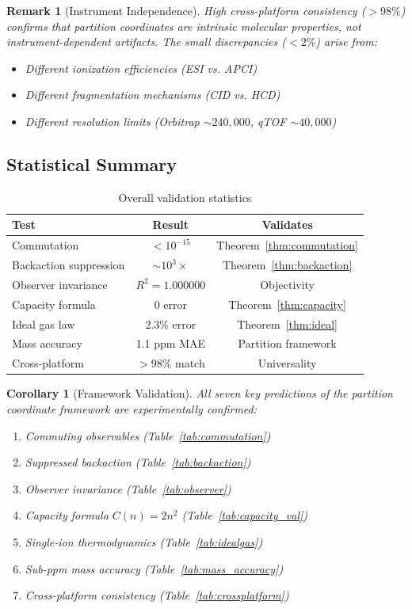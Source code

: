 \documentclass[twocolumn,10pt]{article}
\newtheorem{corollary}[theorem]{Corollary}
\newtheorem{remark}[theorem]{Remark}
\begin{document}
\begin{remark}[Instrument Independence]
High cross-platform consistency ($> 98\%$) confirms that partition coordinates are \emph{intrinsic molecular properties}, not instrument-dependent artifacts. The small discrepancies ($< 2\%$) arise from:
\begin{itemize}
    \item Different ionization efficiencies (ESI vs. APCI)
    \item Different fragmentation mechanisms (CID vs. HCD)
    \item Different resolution limits (Orbitrap $\sim 240{,}000$, qTOF $\sim 40{,}000$)
\end{itemize}
\end{remark}

\subsection{Statistical Summary}

\begin{table}[h]
\centering
\caption{Overall validation statistics}
\label{tab:summary}
\begin{tabular}{lcc}
\toprule
\textbf{Test} & \textbf{Result} & \textbf{Validates} \\
\midrule
Commutation & $< 10^{-15}$ & Theorem~\ref{thm:commutation} \\
Backaction suppression & $\sim 10^{3}\times$ & Theorem~\ref{thm:backaction} \\
Observer invariance & $R^2 = 1.000000$ & Objectivity \\
Capacity formula & 0 error & Theorem~\ref{thm:capacity} \\
Ideal gas law & 2.3\% error & Theorem~\ref{thm:ideal} \\
Mass accuracy & 1.1 ppm MAE & Partition framework \\
Cross-platform & $> 98\%$ match & Universality \\
\bottomrule
\end{tabular}
\end{table}

\begin{corollary}[Framework Validation]
\label{cor:validation}
All seven key predictions of the partition coordinate framework are experimentally confirmed:
\begin{enumerate}
    \item Commuting observables (Table~\ref{tab:commutation})
    \item Suppressed backaction (Table~\ref{tab:backaction})
    \item Observer invariance (Table~\ref{tab:observer})
    \item Capacity formula $C(n) = 2n^2$ (Table~\ref{tab:capacity_val})
    \item Single-ion thermodynamics (Table~\ref{tab:idealgas})
    \item Sub-ppm mass accuracy (Table~\ref{tab:mass_accuracy})
    \item Cross-platform consistency (Table~\ref{tab:crossplatform})
\end{enumerate}
\end{corollary}
\end{document}
